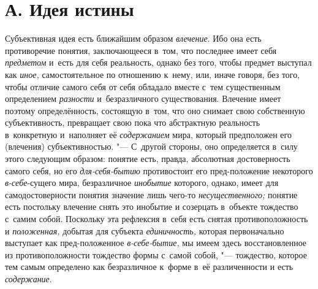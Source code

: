 \section[А. Идея истины]{А. Идея истины}

Субъективная идея есть ближайшим образом {\em влечение}. Ибо она
есть противоречие понятия, заключающееся в~том, что последнее имеет себя
{\em предметом} и~есть
для себя реальность, однако без того, чтобы предмет выступал как {\em иное,}
самостоятельное по отношению к~нему, или, иначе говоря, без
того, чтобы отличие самого себя от себя обладало вместе с~тем существенным
определением {\em разности} и~безразличного существования. Влечение имеет
поэтому определённость, состоящую в~том, что оно снимает свою собственную
субъективность, превращает свою пока что абстрактную реальность
в~конкретную и~наполняет её {\em содержанием} мира,
который предположен его (влечения) субъективностью. "--- С~другой
стороны, оно определяется в~силу этого следующим образом: понятие
есть, правда, абсолютная достоверность самого себя, но его
{\em для-себя-бытию} противостоит его пред-положение некоторого
{\em в-себе}-сущего мира, безразличное {\em инобытие}
которого, однако, имеет для самодостоверности понятия
значение лишь чего-то {\em несущественного;}
понятие есть постольку влечение снять это инобытие и
созерцать в~объекте тождество с~самим собой. Поскольку эта рефлексия в~себя
есть снятая противоположность и {\em положенная,} добытая
для субъекта {\em единичность,} которая первоначально выступает как
пред-положенное {\em в-себе-бытие,} мы
имеем здесь восстановленное из противоположности тождество формы с~самой
собой, "--- тождество, которое тем самым
определено как безразличное к~форме в~её различенности и
есть {\em содержание}.

